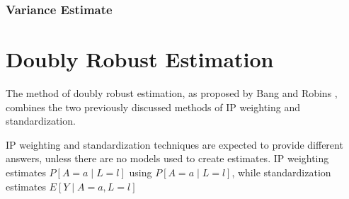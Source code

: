 \subsubsection{Variance Estimate} 


\section{Doubly Robust Estimation} 
The method of doubly robust estimation, as proposed by Bang and Robins \cite{bang2005doubly}, combines the two previously discussed methods of IP weighting and standardization.  

IP weighting and standardization techniques are expected to provide different answers, unless there are no models used to create estimates.\cite{hernan_robins_2016}  
IP weighting estimates $P[A=a \mid L =l]$ using $P[A =a \mid L= l]$, while standardization estimates $E[Y \mid A = a, L=l]$  

